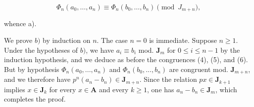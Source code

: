 \[
\Phi_ {n} (a _ {0}, \dots , a _ {n}) \equiv \Phi_ {n} (b _ {0}, \dots , b _ {n}) \pmod{J _ {m + n}},
\]

whence a).

We prove \(b)\) by induction on \(n\). The case \(n=0\) is immediate. Suppose \(n\geqslant1\). Under the hypotheses of \(b)\), we have \(a_{i}\equiv b_{i}\) mod. \(\mathbf{J}_{m}\) for \(0\leqslant i\leqslant n-1\) by the induction hypothesis, and we deduce as before the congruences (4), (5), and (6). But by hypothesis \(\Phi_{n}(a_{0},...,a_{n})\) and \(\Phi_{n}(b_{0},...,b_{n})\) are congruent mod. \(\mathbf{J}_{m+n}\), and we therefore have \(p^{n}(a_{n}-b_{n})\in\mathbf{J}_{m+n}\). Since the relation \(p x\in\mathbf{J}_{k+1}\) implies \(x\in\mathbf{J}_{k}\) for every \(x\in\mathbf{A}\) and every \(k\geqslant1\), one has \(a_{n}-b_{n}\in\mathbf{J}_{m}\), which completes the proof.

